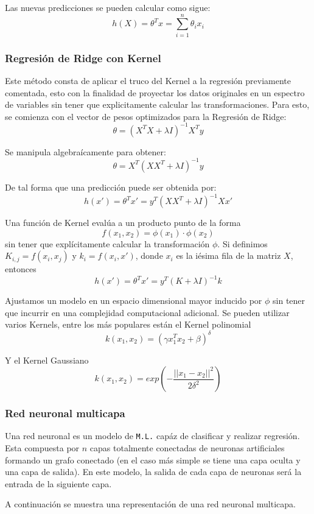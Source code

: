 {Las nuevas predicciones se pueden calcular como sigue: $$h(X) = \theta^Tx=\sum_{i=1}^{n} \theta_ix_i$$

\subsubsection*{Regresión de Ridge con Kernel}

Este método consta de aplicar el truco del Kernel a la regresión previamente comentada, esto con la finalidad de proyectar los datos originales en un espectro de variables sin tener que explicitamente calcular las transformaciones. Para esto, se comienza con el vector de pesos optimizados para la Regresión de Ridge: $$\theta = (X^TX+\lambda I)^{-1} X^T y$$

Se manipula algebraícamente para obtener: $$\theta = X^T(XX^T + \lambda I)^{-1}y$$

De tal forma que una predicción puede ser obtenida por: $$h(x') = \theta^Tx' = y^T(XX^T + \lambda I)^{-1}Xx'$$

Una función de Kernel evalúa a un producto punto de la forma $$f(x_1,x_2) = \phi (x_1)\cdot \phi (x_2)$$ sin tener que explícitamente calcular la transformación $\phi$. Si definimos $K_{i,j}=f(x_i,x_j)$ y $k_i = f(x_i,x')$, donde $x_i$ es la iésima fila de la matriz $X$, entonces $$h(x') = \theta^Tx' = y^T(K + \lambda I)^{-1}k$$

Ajustamos un modelo en un espacio dimensional mayor inducido por $\phi$ sin tener que incurrir en una complejidad computacional adicional. Se pueden utilizar varios Kernels, entre los más populares están el Kernel polinomial $$k(x_1,x_2)=( \gamma x_{1}^{T} x_2 + \beta)^ {\delta}$$

Y el Kernel Gaussiano $$k(x_1,x_2)=exp(-\frac{||x_1-x_2||^2}{2{\delta}^2})$$

\subsubsection*{Red neuronal multicapa}

Una red neuronal es un modelo de \texttt{M.L.} capáz de clasificar y realizar regresión. Esta compuesta por $n$ capas totalmente conectadas de neuronas artificiales formando un grafo conectado (en el caso más simple se tiene una capa oculta y una capa de salida). En este modelo, la salida de cada capa de neuronas será la entrada de la siguiente capa. 

A continuación se muestra una representación de una red neuronal multicapa.

}
